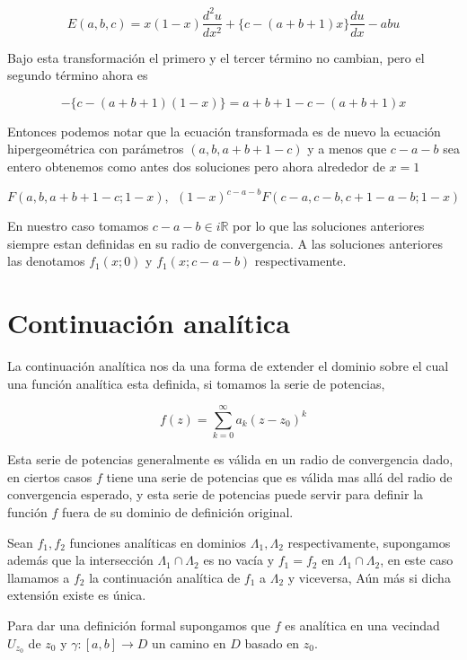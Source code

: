 $$E(a,b,c)=x(1-x) \frac{d^{2}u}{dx^{2}} + \lbrace c- (a+b+1)x \rbrace \frac{du}{dx} -abu$$

 Bajo esta transformaci\'on el primero y el tercer t\'ermino no cambian, pero el segundo t\'ermino ahora es

$$-\lbrace  c- (a+b+1)(1-x)\rbrace = a+b+1-c-(a+b+1)x $$

Entonces podemos notar que la ecuaci\'on transformada es de nuevo la ecuaci\'on hipergeom\'etrica con par\'ametros $ (a,b,a+b+1-c)$ y a menos que $c-a-b$ sea entero obtenemos como antes dos soluciones pero ahora alrededor de $x=1$

$$F(a,b,a+b+1-c;1-x), \ \ (1-x)^{c-a-b}F(c-a,c-b,c+1-a-b;1-x)$$

En nuestro caso tomamos $c-a-b \in i\mathbb{R} $ por lo que las soluciones anteriores siempre estan definidas en su radio de convergencia. A las soluciones anteriores las denotamos $f_{1}(x;0) $ y $f_{1}(x;c-a-b)$ respectivamente.

\section{Continuaci\'on anal\'itica}

La continuaci\'on anal\'itica nos da una forma de extender el dominio sobre el cual una funci\'on anal\'itica esta definida, si tomamos la serie de potencias,

\begin{equation} \label{serie de potencias}
 f(z) = \sum_{k=0}^{\infty} a_{k} (z-z_{0})^{k}
\end{equation}


Esta serie de potencias generalmente es v\'alida en un radio de convergencia dado, en ciertos casos $f$ tiene una serie de potencias que es v\'alida mas all\'a del radio de convergencia esperado, y esta serie de potencias puede servir para definir la funci\'on $f$ fuera de su dominio de definici\'on original.

Sean $f_{1},f_{2}$ funciones anal\'iticas en dominios $\Lambda_{1},\Lambda_{2}$ respectivamente, supongamos adem\'as que la intersecci\'on $\Lambda_{1} \cap \Lambda_{2}$ es no vac\'ia y $f_{1}=f_{2}$ en $\Lambda_{1} \cap \Lambda_{2}$, en este caso llamamos a $f_{2}$ la continuaci\'on anal\'itica de $f_{1}$ a $\Lambda_{2}$ y viceversa, A\'un m\'as si dicha extensi\'on existe es \'unica.

Para dar una definici\'on formal supongamos que $f$ es anal\'itica en una vecindad $U_{z_{0}}$ de $z_{0}$ y $\gamma: [a,b] \rightarrow D $ un camino en $D$ basado en $z_{0}$.


